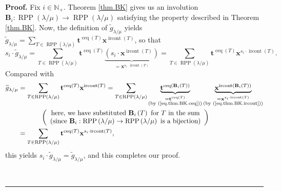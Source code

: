 \documentclass[numbers=enddot,12pt,final,onecolumn,notitlepage]{scrartcl}%
\theoremstyle{definition}
\newenvironment{proof}[1][Proof]{\noindent\textbf{#1.} }{\ \rule{0.5em}{0.5em}}
\newenvironment{vershort}{}{}
\let\sumnonlimits\sum
\renewcommand{\sum}{\sumnonlimits\limits}
\begin{document}
\begin{proof}
\begin{vershort}
Fix $i\in\mathbb{N}_{+}$. Theorem \ref{thm.BK} gives us an involution
$\mathbf{B}_{i}:\operatorname*{RPP}\left(  \lambda/\mu\right)  \rightarrow
\operatorname*{RPP}\left(  \lambda/\mu\right)  $ satisfying the property
described in Theorem \ref{thm.BK}. Now, the definition of $\widetilde{g}%
_{\lambda/\mu}$ yields $\widetilde{g}_{\lambda/\mu}=\sum_{T\in
\operatorname*{RPP}\left(  \lambda/\mu\right)  }\mathbf{t}%
^{\operatorname*{ceq}\left(  T\right)  }\mathbf{x}^{\operatorname*{ircont}%
\left(  T\right)  }$, so that%
\[
s_{i}\cdot\widetilde{g}_{\lambda/\mu}=\sum_{T\in\operatorname*{RPP}\left(
\lambda/\mu\right)  }\mathbf{t}^{\operatorname*{ceq}\left(  T\right)
}\underbrace{\left(  s_{i}\cdot\mathbf{x}^{\operatorname*{ircont}\left(
T\right)  }\right)  }_{=\mathbf{x}^{s_{i}\cdot\operatorname*{ircont}\left(
T\right)  }}=\sum_{T\in\operatorname*{RPP}\left(  \lambda/\mu\right)
}\mathbf{t}^{\operatorname*{ceq}\left(  T\right)  }\mathbf{x}^{s_{i}%
\cdot\operatorname*{ircont}\left(  T\right)  }.
\]
Compared with%
\begin{align*}
\widetilde{g}_{\lambda/\mu}  &  =\sum_{T\in\operatorname*{RPP}\left(
\lambda/\mu\right)  }\mathbf{t}^{\operatorname*{ceq}\left(  T\right)
}\mathbf{x}^{\operatorname*{ircont}\left(  T\right)  }=\sum_{T\in
\operatorname*{RPP}\left(  \lambda/\mu\right)  }\underbrace{\mathbf{t}%
^{\operatorname*{ceq}\left(  \mathbf{B}_{i}\left(  T\right)  \right)  }%
}_{\substack{=\mathbf{t}^{\operatorname*{ceq}\left(  T\right)  }\\\text{(by
(\ref{eq.thm.BK.ceq}))}}}\underbrace{\mathbf{x}^{\operatorname*{ircont}\left(
\mathbf{B}_{i}\left(  T\right)  \right)  }}_{\substack{=\mathbf{x}^{s_{i}%
\cdot\operatorname*{ircont}\left(  T\right)  }\\\text{(by
(\ref{eq.thm.BK.ircont}))}}}\\
&  \ \ \ \ \ \ \ \ \ \ \left(
\begin{array}
[c]{c}%
\text{here, we have substituted }\mathbf{B}_{i}\left(  T\right)  \text{ for
}T\text{ in the sum}\\
\text{(since }\mathbf{B}_{i}:\operatorname*{RPP}\left(  \lambda/\mu\right)
\rightarrow\operatorname*{RPP}\left(  \lambda/\mu\right)  \text{ is a
bijection)}%
\end{array}
\right) \\
&  =\sum_{T\in\operatorname*{RPP}\left(  \lambda/\mu\right)  }\mathbf{t}%
^{\operatorname*{ceq}\left(  T\right)  }\mathbf{x}^{s_{i}\cdot
\operatorname*{ircont}\left(  T\right)  },
\end{align*}
this yields $s_{i}\cdot\widetilde{g}_{\lambda/\mu}=\widetilde{g}_{\lambda/\mu
}$, and this completes our proof.
\end{vershort}


\end{proof}
\end{document}
